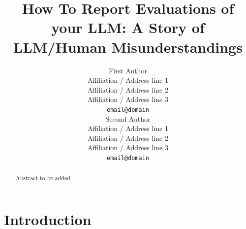 \documentclass[11pt]{article}
\title{How To Report Evaluations of your LLM: A Story of LLM/Human Misunderstandings}
\author{First Author \\
  Affiliation / Address line 1 \\
  Affiliation / Address line 2 \\
  Affiliation / Address line 3 \\
  \texttt{email@domain} \\\And
  Second Author \\
  Affiliation / Address line 1 \\
  Affiliation / Address line 2 \\
  Affiliation / Address line 3 \\
  \texttt{email@domain} \\}
\begin{document}
\maketitle
\begin{abstract}
Abstract to be added.
\end{abstract}

\section{Introduction}
\label{sec:introduction}

%
%
%
\end{document}
